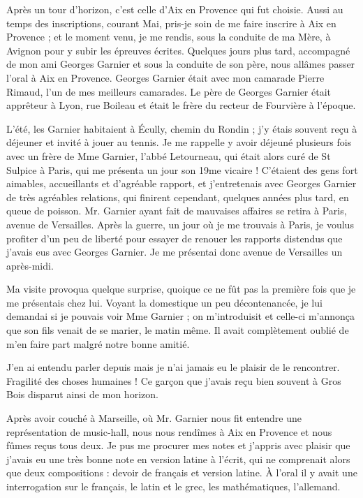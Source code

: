 \documentclass[11pt,a4paper]{report}
\begin{document}
Après un tour d'horizon, c'est celle d'Aix en Provence qui fut choisie. Aussi au temps des inscriptions, courant Mai, pris-je soin de me faire inscrire à Aix en Provence ; et le moment venu, je me rendis, sous la conduite de ma Mère, à Avignon pour y subir les épreuves écrites. Quelques jours plus tard, accompagné de mon ami Georges Garnier et sous la conduite de son père, nous allâmes passer l'oral à Aix en Provence. Georges Garnier était avec mon camarade Pierre Rimaud, l'un de mes meilleurs camarades. Le père de Georges Garnier était apprêteur à Lyon, rue Boileau et était le frère du recteur de Fourvière à l'époque.

L'été, les Garnier habitaient à Écully, chemin du Rondin ; j'y étais souvent reçu à déjeuner et invité à jouer au tennis. Je me rappelle y avoir déjeuné plusieurs fois avec un frère de Mme Garnier, l'abbé Letourneau, qui était alors curé de St Sulpice à Paris, qui me présenta un jour son 19me vicaire ! C'étaient des gens fort aimables, accueillants et d'agréable rapport, et j'entretenais avec Georges Garnier de très agréables relations, qui finirent cependant, quelques années plus tard, en queue de poisson. Mr. Garnier ayant fait de mauvaises affaires se retira à Paris, avenue de Versailles. Après la guerre, un jour où je me trouvais à Paris, je voulus profiter d'un peu de liberté pour essayer de renouer les rapports distendus que j'avais eus avec Georges Garnier. Je me présentai donc avenue de Versailles un après-midi.

Ma visite provoqua quelque surprise, quoique ce ne fût pas la première fois que je me présentais chez lui. Voyant la domestique un peu décontenancée, je lui demandai si je pouvais voir Mme Garnier ; on m'introduisit et celle-ci m'annonça que son fils venait de se marier, le matin même. Il avait complètement oublié de m'en faire part malgré notre bonne amitié.

J'en ai entendu parler depuis mais je n'ai jamais eu le plaisir de le rencontrer. Fragilité des choses humaines ! Ce garçon que j'avais reçu bien souvent à Gros Bois disparut ainsi de mon horizon.

Après avoir couché à Marseille, où Mr. Garnier nous fit entendre une représentation de music-hall, nous nous rendîmes à Aix en Provence et nous fûmes reçus tous deux. Je pus me procurer mes notes et j'appris avec plaisir que j'avais eu une très bonne note en version latine à l'écrit, qui ne comprenait alors que deux compositions : devoir de français et version latine. À l'oral il y avait une interrogation sur le français, le latin et le grec, les mathématiques, l'allemand.
\end{document}
